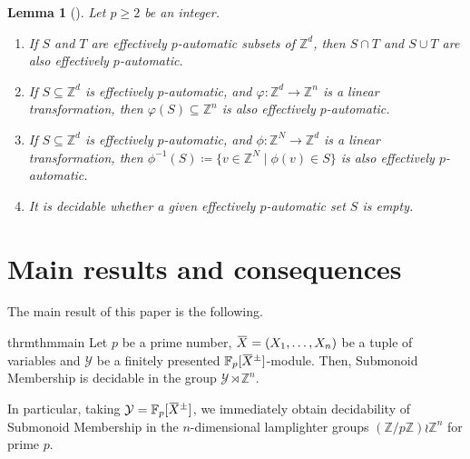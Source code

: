 \documentclass[a4paper,UKenglish,cleveref, autoref, thm-restate]{lipics-v2021}
\newcommand{\Z}{\mathbb{Z}}
\newcommand{\F}{\mathbb{F}}
\newcommand{\mY}{\mathcal{Y}}
\newcommand{\oX}{\mkern 1.5mu\overline{\mkern-1.5mu X \mkern-1.5mu}\mkern 1.5mu}
\newtheorem{lem}[thrm]{Lemma}
\theoremstyle{definition}
\theoremstyle{definition}
\theoremstyle{definition}
\begin{document}
\begin{lem}[{\cite{wolper2000construction}}]\label{lem:pauto}
    Let $p \geq 2$ be an integer.
    \begin{enumerate}[(1)]
        \item If $S$ and $T$ are effectively $p$-automatic subsets of $\Z^d$, then $S \cap T$ and $S \cup T$ are also effectively $p$-automatic.
        \item If $S \subseteq \Z^d$ is effectively $p$-automatic, and $\varphi \colon \Z^d \rightarrow \Z^n$ is a linear transformation, then $\varphi(S) \subseteq \Z^n$ is also effectively $p$-automatic.
        \item If $S \subseteq \Z^d$ is effectively $p$-automatic, and $\phi \colon \Z^N \rightarrow \Z^d$ is a linear transformation, then $\phi^{-1}(S) \coloneqq \{v \in \Z^N \mid \phi(v) \in S\}$ is also effectively $p$-automatic.
        \item It is decidable whether a given effectively $p$-automatic set $S$ is empty.
    \end{enumerate}
\end{lem}

\section{Main results and consequences}\label{sec:mainres}

The main result of this paper is the following.

\begin{restatable}{thrm}{thmmain}\label{thm:main}
    Let $p$ be a prime number, $\oX = (X_1, \ldots, X_n)$ be a tuple of variables and $\mY$ be a finitely presented $\F_p[\oX^{\pm}]$-module.
    Then, Submonoid Membership is decidable in the group $\mY \rtimes \Z^n$.
\end{restatable}

In particular, taking $\mY = \F_p[\oX^{\pm}]$, we immediately obtain decidability of Submonoid Membership in the $n$-dimensional lamplighter groups $(\Z/p\Z) \wr \Z^n$ for prime $p$. 
\end{document}
